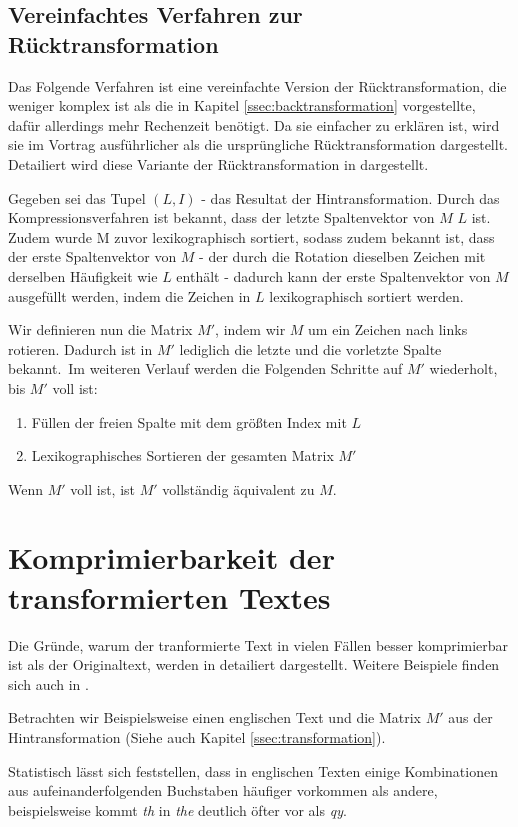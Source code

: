 \documentclass[ngerman,pdftex,paper=A4,DIV=calc,titlepage,12pt]{scrartcl}
\newtheorem[L]{boxedDefinition}{Definition}
\begin{document}
\subsection{Vereinfachtes Verfahren zur Rücktransformation}
Das Folgende Verfahren ist eine vereinfachte Version der Rücktransformation, die weniger komplex ist als die in Kapitel \vref{ssec:backtransformation} vorgestellte, dafür allerdings mehr Rechenzeit benötigt. Da sie einfacher zu erklären ist, wird sie im Vortrag ausführlicher als die ursprüngliche Rücktransformation dargestellt. Detailiert wird diese Variante der Rücktransformation in \cite{Wik2012-1} dargestellt.

Gegeben sei das Tupel $(L,I)$ - das Resultat der Hintransformation.
Durch das Kompressionsverfahren ist bekannt, dass der letzte Spaltenvektor von $M$ $L$ ist. Zudem wurde M zuvor lexikographisch sortiert, sodass zudem bekannt ist, dass der erste Spaltenvektor von $M$ - der durch die Rotation dieselben Zeichen mit derselben Häufigkeit wie $L$ enthält - dadurch kann der erste Spaltenvektor von $M$ ausgefüllt werden, indem die Zeichen in $L$ lexikographisch sortiert werden.

Wir definieren nun die Matrix $M'$, indem wir $M$ um ein Zeichen nach links rotieren. Dadurch ist in $M'$ lediglich die letzte und die vorletzte Spalte bekannt.\
\noindent Im weiteren Verlauf werden die Folgenden Schritte auf $M'$ wiederholt, bis $M'$ voll ist:
\begin{enumerate}
 \item Füllen der freien Spalte mit dem größten Index mit $L$
 \item Lexikographisches Sortieren der gesamten Matrix $M'$
\end{enumerate}
Wenn $M'$ voll ist, ist $M'$ vollständig äquivalent zu $M$.
\section{Komprimierbarkeit der transformierten Textes}
Die Gründe, warum der tranformierte Text in vielen Fällen besser komprimierbar ist als der Originaltext, werden in \cite{burrows1994block} detailiert dargestellt. Weitere Beispiele finden sich auch in \cite{Wik2012-1}.

Betrachten wir Beispielsweise einen englischen Text und die Matrix $M'$ aus der Hintransformation (Siehe auch Kapitel \vref{ssec:transformation}).

Statistisch lässt sich feststellen, dass in englischen Texten einige Kombinationen aus aufeinanderfolgenden Buchstaben häufiger vorkommen als andere, beispielsweise kommt \textit{th} in \textit{the} deutlich öfter vor als \textit{qy}.
\end{document}
